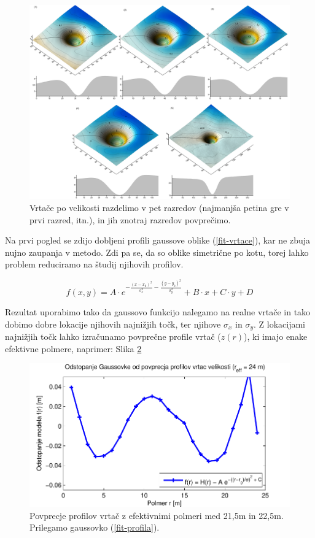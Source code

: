 \documentclass[a4paper, oneside, 12pt]{book}
\begin{document}
\begin{figure}
  \centering
  \includegraphics[width=19cm,angle=90]{slike/vrtace-po-razredih-menisija}
  \caption{Vrtače po velikosti razdelimo v pet razredov (najmanjša petina gre v prvi razred, itn.), in jih znotraj razredov povprečimo.}
  \label{fig:menisija-vrtace-po-razredih}
\end{figure}

Na prvi pogled se zdijo dobljeni profili gaussove oblike (\ref{fit-vrtace}), kar ne zbuja nujno zaupanja v metodo. Zdi pa se, da so oblike simetrične po kotu, torej lahko problem reduciramo na študij njihovih profilov. 

\begin{equation}
  f(x,y) = A \cdot e^{-\frac{(x-x_0)^2}{\sigma_x^2}-\frac{(y-y_0)^2}{\sigma_y^2}} + B \cdot x + C \cdot y + D  
  \label{fit-vrtace}
\end{equation}

Rezultat uporabimo tako da gaussovo funkcijo nalegamo na realne vrtače in tako dobimo dobre lokacije njihovih najnižjih točk, ter njihove $\sigma_x$ in $\sigma_y$. Z lokacijami najnižjih točk lahko izračunamo povprečne profile vrtač ($z(r)$), ki imajo enake efektivne polmere, naprimer: Slika \ref{fig:menisija-profil-21-fit}

\begin{figure}[H]
  \centering
  \includegraphics{slike/menisija-profil-21-fit}
  \caption{Povprecje profilov vrtač z efektivnimi polmeri med 21,5m in 22,5m. Prilegamo gaussovko (\ref{fit-profila}).}
  \label{fig:menisija-profil-21-fit}
\end{figure}
\end{document}
